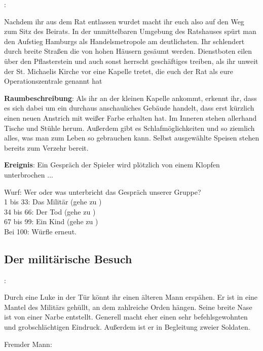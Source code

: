 
:

Nachdem ihr aus dem Rat entlassen wurdet macht ihr euch also auf den Weg zum Sitz des Beirats. In der unmittelbaren Umgebung des Ratshauses spürt man den Aufstieg Hamburgs als Handelsmetropole am deutlichsten. Ihr schlendert durch breite Straßen die von hohen Häusern gesäumt werden. Dienstboten eilen über den Pflasterstein und auch sonst herrscht geschäftiges treiben, als ihr unweit der St. Michaelis Kirche vor eine Kapelle tretet, die euch der Rat als eure Operationszentrale genannt hat

\textbf{Raumbeschreibung}: Als ihr an der kleinen Kapelle ankommt, erkennt ihr, dass es sich dabei um ein durchaus anschauliches Gebäude handelt, dass erst kürzlich einen neuen Anstrich mit weißer Farbe erhalten hat. Im Inneren stehen allerhand Tische und Stühle herum. Außerdem gibt es Schlafmöglichkeiten und so ziemlich alles, was man zum Leben so gebrauchen kann. Selbst ausgewählte Speisen stehen bereits zum Verzehr bereit.

\textbf{Ereignis}: Ein Gespräch der Spieler wird plötzlich von einem Klopfen unterbrochen ...

\begin{tcolorbox}
  Wurf: Wer oder was unterbricht das Gespräch unserer Gruppe? \\
  1 bis 33: Das Militär (gehe zu \blue{\ref{militär}}) \\
  34 bis 66: Der Tod (gehe zu \blue{\ref{tot}}) \\
  67 bis 99: Ein Kind (gehe zu \blue{\ref{kind}}) \\
  Bei 100: Würfle erneut.
\end{tcolorbox}

\subsection{Der militärische Besuch}
\label{militär}

:

Durch eine Luke in der Tür könnt ihr einen älteren Mann erspähen. Er ist in eine Mantel des Militärs gehüllt, an dem zahlreiche Orden hängen. Seine breite Nase ist von einer Narbe entstellt. Generell macht eher einen sehr befehlsgewohnten und grobschlächtigen Eindruck. Außerdem ist er in Begleitung zweier Soldaten.

Fremder Mann:

